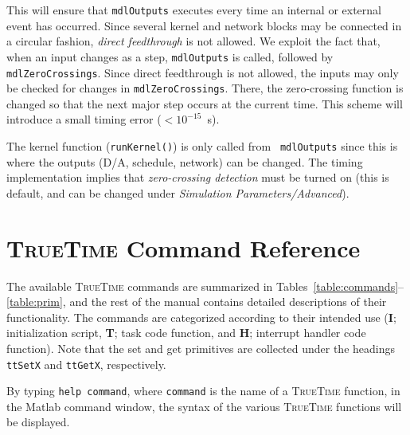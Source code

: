\documentclass[final,twoside]{rapport}
\begin{document}
This will ensure that {\tt mdlOutputs} executes every time an internal
or external event has occurred. Since several kernel and network
blocks may be connected in a circular fashion, {\em direct
  feedthrough} is not allowed. We exploit the fact that, when an input
changes as a step, {\tt mdlOutputs} is called, followed by {\tt
  mdlZeroCrossings}. Since direct feedthrough is not allowed, the
inputs may only be checked for changes in {\tt mdlZeroCrossings}.
There, the zero-crossing function is changed so that the next major
step occurs at the current time. This scheme will introduce a small
timing error ($<10^{-15}$~s).

The kernel function (\texttt{runKernel()}) is only called from {\tt
  mdlOutputs} since this is where the outputs (D/A, schedule, network)
can be changed. The timing implementation implies that {\em
  zero-crossing detection} must be turned on (this is default, and can
be changed under {\em Simulation Parameters/Advanced}).

\section{\textsc{TrueTime} Command Reference}
\label{sec:command_reference}
The available \textsc{TrueTime} commands are summarized in
Tables~\ref{table:commands}--\ref{table:prim}, and the rest of the
manual contains detailed descriptions of their functionality. The
commands are categorized according to their intended use ({\bf I};
initialization script, {\bf T}; task code function, and {\bf H};
interrupt handler code function). Note that the set and get primitives
are collected under the headings {\tt ttSetX} and {\tt ttGetX},
respectively.

By typing \texttt{help command}, where \texttt{command} is the name of
a \textsc{TrueTime} function, in the Matlab command window, the syntax
of the various \textsc{TrueTime} functions will be displayed.
\end{document}
